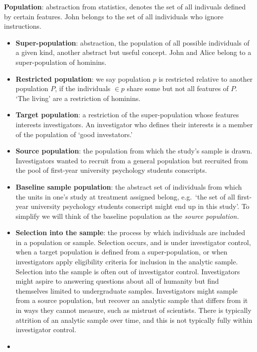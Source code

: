 \documentclass[
  single column]{article}
\begin{document}
\textbf{Population}: abstraction from statistics, denotes the set of all
indivuals defined by certain features. John belongs to the set of all
individuals who ignore instructions.

\begin{itemize}
\item
  \textbf{Super-population}: abstraction, the population of all possible
  individuals of a given kind, another abstract but useful concept. John
  and Alice belong to a super-population of hominins.
\item
  \textbf{Restricted population}: we say population \(p\) is restricted
  relative to another population \(P\), if the individuals \(\in p\)
  share some but not all features of \(P\). `The living' are a
  restriction of hominins.
\item
  \textbf{Target population}: a restriction of the super-population
  whose features interests investigators. An investigator who defines
  their interests is a member of the population of `good investators.'
\item
  \textbf{Source population}: the population from which the study's
  sample is drawn. Investigators wanted to recruit from a general
  population but recruited from the pool of first-year university
  psychology students conscripts.
\item
  \textbf{Baseline sample population}: the abstract set of individuals
  from which the units in one's study at treatment assigned belong,
  e.g.~`the set of all first-year university psychology students
  conscript might end up in this study'. To simplify we will think of
  the baseline population as the \emph{source population.}
\item
  \textbf{Selection into the sample}: the process by which individuals
  are included in a population or sample. Selection occurs, and is under
  investigator control, when a target population is defined from a
  super-population, or when investigators apply eligibility criteria for
  inclusion in the analytic sample. Selection into the sample is often
  out of investigator control. Investigators might aspire to answering
  questions about all of humanity but find themselves limited to
  undergraduate samples. Investigators might sample from a source
  population, but recover an analytic sample that differs from it in
  ways they cannot measure, such as mistrust of scientists. There is
  typically attrition of an analytic sample over time, and this is not
  typically fully within investigator control.
\item

\end{itemize}
\end{document}
